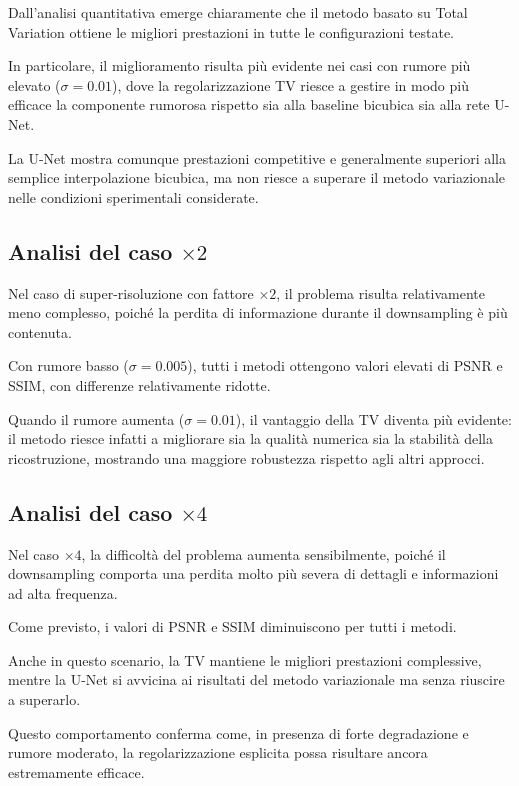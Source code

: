 \documentclass{article}
\begin{document}
Dall’analisi quantitativa emerge chiaramente che il metodo basato su Total Variation ottiene le migliori prestazioni in tutte le configurazioni testate.

In particolare, il miglioramento risulta più evidente nei casi con rumore più elevato (\(\sigma = 0.01\)), dove la regolarizzazione TV riesce a gestire in modo più efficace la componente rumorosa rispetto sia alla baseline bicubica sia alla rete U-Net.

La U-Net mostra comunque prestazioni competitive e generalmente superiori alla semplice interpolazione bicubica, ma non riesce a superare il metodo variazionale nelle condizioni sperimentali considerate.

\subsection{Analisi del caso \(\times 2\)}

Nel caso di super-risoluzione con fattore \(\times 2\), il problema risulta relativamente meno complesso, poiché la perdita di informazione durante il downsampling è più contenuta.

Con rumore basso (\(\sigma = 0.005\)), tutti i metodi ottengono valori elevati di PSNR e SSIM, con differenze relativamente ridotte.

Quando il rumore aumenta (\(\sigma = 0.01\)), il vantaggio della TV diventa più evidente: il metodo riesce infatti a migliorare sia la qualità numerica sia la stabilità della ricostruzione, mostrando una maggiore robustezza rispetto agli altri approcci.

\subsection{Analisi del caso \(\times 4\)}

Nel caso \(\times 4\), la difficoltà del problema aumenta sensibilmente, poiché il downsampling comporta una perdita molto più severa di dettagli e informazioni ad alta frequenza.

Come previsto, i valori di PSNR e SSIM diminuiscono per tutti i metodi.

Anche in questo scenario, la TV mantiene le migliori prestazioni complessive, mentre la U-Net si avvicina ai risultati del metodo variazionale ma senza riuscire a superarlo.

Questo comportamento conferma come, in presenza di forte degradazione e rumore moderato, la regolarizzazione esplicita possa risultare ancora estremamente efficace.
\end{document}
